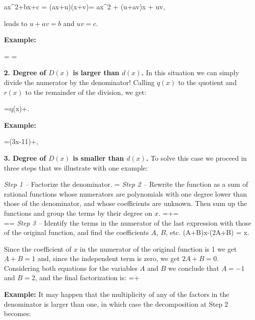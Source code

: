 \bnn ax^2+bx+c = (ax+u)(x+v)= ax^2 + (u+av)x + uv, \enn

leads to $u+av=b$ and $uv=c$. 

{\bf Example:}

\bnn
{} =  = 
\enn


{\bf 2. Degree of $D(x)$ is larger than $d(x)$. } In this situation we can simply divide the numerator
by the denominator! Calling $q(x)$ to the quotient and $r(x)$ to the remainder of the division, we get:

\bnn
	=q(x)+.
\enn

{\bf Example:}

\bnn
	=(3x-11)+,
\enn

{\bf 3. Degree of $D(x)$ is smaller than $d(x)$. } To solve this case we proceed in three steps that we illustrate with one example:

{\em Step 1 --} Factorize the denominator.
\bnn
	=
\enn
{\em Step 2 --} Rewrite the function as a sum of rational functions whose numerators are polynomials with one degree lower than those of the denominator, and whose coefficients are unknown. Then sum up the functions and group the terms by their degree on $x$.
\bnn
	=+=\\
	==
\enn
{\em Step 3 --} Identify the terms in the numerator of the last expression with those of the original function, and find the coefficients $A$, $B$, etc.
\bnn
	(A+B)x-(2A+B) = x.
\enn

Since the coefficient of $x$ in the numerator of the original function is 1 we get $A+B=1$ and, since the independent term is zero, we get $2A+B=0$. Considering both equations for the variables $A$ and $B$ we conclude that $A=-1$ and $B=2$, and the final factorization is:
\bnn
	=+
\enn

{\bf Example:} It may happen that the multiplicity of any of the factors in the denominator is larger than one, in which case the decomposition at Step 2 becomes:

